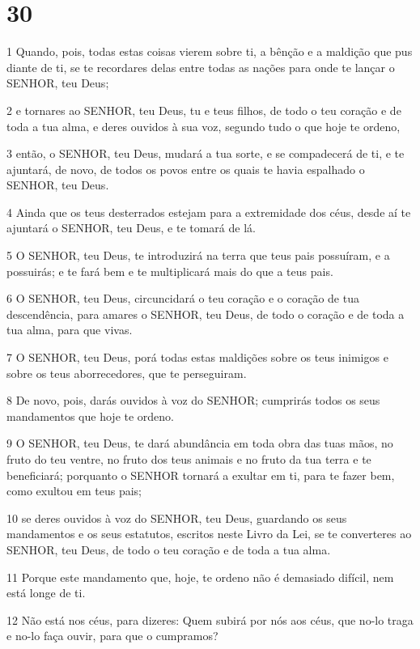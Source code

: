 \chapter{30}

\par 1 Quando, pois, todas estas coisas vierem sobre ti, a bênção e a maldição que pus diante de ti, se te recordares delas entre todas as nações para onde te lançar o SENHOR, teu Deus;
\par 2 e tornares ao SENHOR, teu Deus, tu e teus filhos, de todo o teu coração e de toda a tua alma, e deres ouvidos à sua voz, segundo tudo o que hoje te ordeno,
\par 3 então, o SENHOR, teu Deus, mudará a tua sorte, e se compadecerá de ti, e te ajuntará, de novo, de todos os povos entre os quais te havia espalhado o SENHOR, teu Deus.
\par 4 Ainda que os teus desterrados estejam para a extremidade dos céus, desde aí te ajuntará o SENHOR, teu Deus, e te tomará de lá.
\par 5 O SENHOR, teu Deus, te introduzirá na terra que teus pais possuíram, e a possuirás; e te fará bem e te multiplicará mais do que a teus pais.
\par 6 O SENHOR, teu Deus, circuncidará o teu coração e o coração de tua descendência, para amares o SENHOR, teu Deus, de todo o coração e de toda a tua alma, para que vivas.
\par 7 O SENHOR, teu Deus, porá todas estas maldições sobre os teus inimigos e sobre os teus aborrecedores, que te perseguiram.
\par 8 De novo, pois, darás ouvidos à voz do SENHOR; cumprirás todos os seus mandamentos que hoje te ordeno.
\par 9 O SENHOR, teu Deus, te dará abundância em toda obra das tuas mãos, no fruto do teu ventre, no fruto dos teus animais e no fruto da tua terra e te beneficiará; porquanto o SENHOR tornará a exultar em ti, para te fazer bem, como exultou em teus pais;
\par 10 se deres ouvidos à voz do SENHOR, teu Deus, guardando os seus mandamentos e os seus estatutos, escritos neste Livro da Lei, se te converteres ao SENHOR, teu Deus, de todo o teu coração e de toda a tua alma.
\par 11 Porque este mandamento que, hoje, te ordeno não é demasiado difícil, nem está longe de ti.
\par 12 Não está nos céus, para dizeres: Quem subirá por nós aos céus, que no-lo traga e no-lo faça ouvir, para que o cumpramos?
